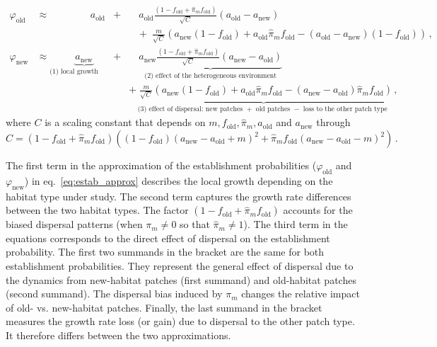 \documentclass[a4paper,11pt]{article}
\begin{document}
\begin{equation}\label{eq:estab_approx}
	\begin{aligned}
		\varphi_{\text{old}} &\approx \qquad \quad \; \; \; \; a_{\text{old}}&+ & \quad a_{\text{old}} \frac{\left(1-f_{\text{old}}+\widehat{\pi}_m f_{\text{old}}\right)}{\sqrt{C}}(a_{\text{old}}-a_{\text{new}}) \\
		& & &  \; \; \; + \; \frac{m}{\sqrt{C}} \left(a_{\text{new}}(1-f_{\text{old}}) + a_{\text{old}}\widehat{\pi}_m f_{\text{old}} - (a_{\text{old}}-a_{\text{new}})(1-f_{\text{old}})\right) \, ,\\
		\varphi_{\text{new}} &\approx \underbrace{ a_{\text{new}}}_{\text{(1) local growth parameter}} &+ & \quad \underbrace{ a_{\text{new}} \frac{\left(1-f_{\text{old}}+\widehat{\pi}_m f_{\text{old}}\right)}{\sqrt{C}}(a_{\text{new}}-a_{\text{old}})}_{\text{(2) effect of the heterogeneous environment}} \\
	& & &  \underbrace{+\; \frac{m}{\sqrt{C}}\left( a_{\text{new}}(1-f_{\text{old}}) + a_{\text{old}} \widehat{\pi}_m f_{\text{old}} - (a_{\text{new}}-a_{\text{old}}) \widehat{\pi}_m f_{\text{old}} \right)\, ,}_{\text{(3) effect of dispersal: new patches $+$ old patches $-$ loss to the other patch type }}
	\end{aligned}
\end{equation}
where $C$ is a scaling constant that depends on $m,f_{\text{old}},\widehat{\pi}_m,a_{\text{old}}$ and $a_{\text{new}}$ through
\begin{equation}\label{eq:normalization}
	C = (1-f_{\text{old}}+\widehat{\pi}_m f_{\text{old}}) \left((1-f_{\text{old}})(a_{\text{new}}-a_{\text{old}}+m)^2 + \widehat{\pi}_m f_{\text{old}} (a_{\text{new}}-a_{\text{old}}-m)^2\right)\, . 
\end{equation}

The first term in the approximation of the establishment probabilities ($\varphi_{\text{old}}$ and $\varphi_{\text{new}}$) in eq.~\eqref{eq:estab_approx} describes the local growth depending on the habitat type under study. 
The second term captures the growth rate differences between the two habitat types.
The factor $(1-f_{\text{old}}+\widehat{\pi}_m f_{\text{old}})$ accounts for the biased dispersal patterns (when $\pi_m\neq 0$ so that $\widehat{\pi}_m\neq 1$). 
The third term in the equations corresponds to the direct effect of dispersal on the establishment probability. 
The first two summands in the bracket are the same for both establishment probabilities. They represent the general effect of dispersal due to the dynamics from new-habitat patches (first summand) and old-habitat patches (second summand). The dispersal bias induced by $\pi_m$ changes the relative impact of old- vs. new-habitat patches. 
Finally, the last summand in the bracket measures the growth rate loss (or gain) due to dispersal to the other patch type. It therefore differs between the two approximations.
\end{document}
